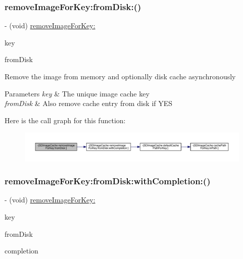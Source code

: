 \subsubsection{\texorpdfstring{remove\+Image\+For\+Key\+:from\+Disk\+:()}{removeImageForKey:fromDisk:()}\hspace{0.1cm}{\footnotesize\ttfamily [3/3]}}
{\footnotesize\ttfamily -\/ (void) \mbox{\hyperlink{interface_s_d_image_cache_a1d6ca2afef59216e0cb1740d431833cf}{remove\+Image\+For\+Key\+:}} \begin{DoxyParamCaption}\item[{(N\+S\+String $\ast$)}]{key }\item[{fromDisk:(B\+O\+OL)}]{from\+Disk }\end{DoxyParamCaption}}

Remove the image from memory and optionally disk cache asynchronously


\begin{DoxyParams}{Parameters}
{\em key} & The unique image cache key \\
\hline
{\em from\+Disk} & Also remove cache entry from disk if Y\+ES \\
\hline
\end{DoxyParams}
Here is the call graph for this function\+:\nopagebreak
\begin{figure}[H]
\begin{center}
\leavevmode
\includegraphics[width=350pt]{interface_s_d_image_cache_a61cf4a9222043f0b302b8fdb0b522e3f_cgraph}
\end{center}
\end{figure}
\mbox{\label{interface_s_d_image_cache_abf0e1a46fc6db455e464efda62fcc55d}} 
\subsubsection{\texorpdfstring{remove\+Image\+For\+Key\+:from\+Disk\+:with\+Completion\+:()}{removeImageForKey:fromDisk:withCompletion:()}\hspace{0.1cm}{\footnotesize\ttfamily [1/3]}}
{\footnotesize\ttfamily -\/ (void) \mbox{\hyperlink{interface_s_d_image_cache_a1d6ca2afef59216e0cb1740d431833cf}{remove\+Image\+For\+Key\+:}} \begin{DoxyParamCaption}\item[{(N\+S\+String $\ast$)}]{key }\item[{fromDisk:(B\+O\+OL)}]{from\+Disk }\item[{withCompletion:(S\+D\+Web\+Image\+No\+Params\+Block)}]{completion }\end{DoxyParamCaption}}

